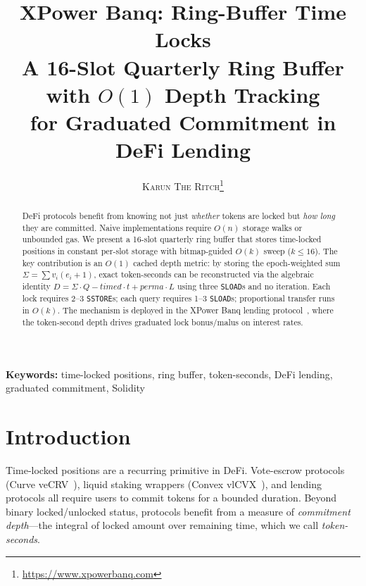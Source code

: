 \documentclass[10pt,a4paper,twocolumn]{article}
\title{\textbf{\Large XPower Banq: Ring-Buffer Time Locks}\\[0.3em]
\normalsize A 16-Slot Quarterly Ring Buffer with $O(1)$ Depth Tracking\\
for Graduated Commitment in DeFi Lending}
\author{
    \textsc{Karun The Ritch}\thanks{\url{https://www.xpowerbanq.com}}
}
\date{}
\theoremstyle{definition}
\theoremstyle{plain}
\theoremstyle{remark}
\begin{document}
\maketitle


\begin{abstract}
DeFi protocols benefit from knowing not just \emph{whether} tokens are locked but \emph{how long} they are committed. Naive implementations require $O(n)$ storage walks or unbounded gas. We present a 16-slot quarterly ring buffer that stores time-locked positions in constant per-slot storage with bitmap-guided $O(k)$ sweep ($k\leq 16$). The key contribution is an $O(1)$ cached depth metric: by storing the epoch-weighted sum $\Sigma = \sum v_i(e_i{+}1)$, exact token-seconds can be reconstructed via the algebraic identity $D = \Sigma \cdot Q - \mathit{timed}\cdot t + \mathit{perma}\cdot L$ using three \texttt{SLOAD}s and no iteration. Each lock requires 2--3 \texttt{SSTORE}s; each query requires 1--3 \texttt{SLOAD}s; proportional transfer runs in $O(k)$. The mechanism is deployed in the XPower Banq lending protocol~\cite{wp}, where the token-second depth drives graduated lock bonus/malus on interest rates.
\end{abstract}

\textbf{Keywords:} time-locked positions, ring buffer, token-seconds, DeFi lending, graduated commitment, Solidity

\section{Introduction}
\label{sec:introduction}

Time-locked positions are a recurring primitive in DeFi. Vote-escrow protocols (Curve veCRV~\cite{curve}), liquid staking wrappers (Convex vlCVX~\cite{convex}), and lending protocols all require users to commit tokens for a bounded duration. Beyond binary locked/unlocked status, protocols benefit from a measure of \emph{commitment depth}---the integral of locked amount over remaining time, which we call \emph{token-seconds}.
\end{document}
